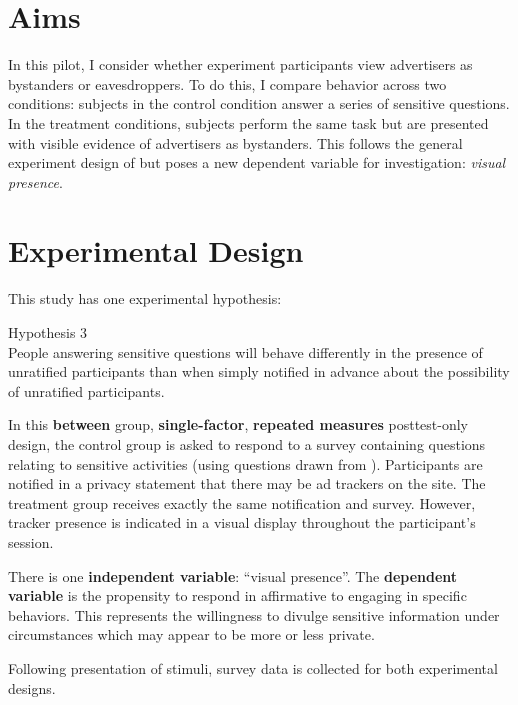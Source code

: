 \section{Aims}
\label{aims}

In this pilot, I consider whether experiment participants view advertisers as bystanders or eavesdroppers. To do this, I compare behavior across two conditions: subjects in the control condition answer a series of sensitive questions. In the treatment conditions, subjects perform the same task but are presented with visible evidence of advertisers as bystanders. This follows the general experiment design of  \citep{Acquisti:2012tp}  but poses a new dependent variable for investigation: \emph{visual presence}.

\section{Experimental Design}
\label{experimentaldesign}

This study has one experimental hypothesis:

\begin{description}
\item{Hypothesis 3} \hfill \\
People answering sensitive questions will behave differently in the presence of unratified participants than when simply notified in advance about the possibility of unratified participants.
\end{description}

In this \textbf{between} group, \textbf{single-factor}, \textbf{repeated measures} posttest-only design, the control group is asked to respond to a survey containing questions relating to sensitive activities (using questions drawn from  \cite{Acquisti:2012tp}).  Participants are notified in a privacy statement that there may be ad trackers on the site. The treatment group receives exactly the same notification and survey. However, tracker presence is indicated in a visual display throughout the participant's session. 

There is one \textbf{independent variable}: ``visual presence''. The \textbf{dependent variable} is the propensity to respond in affirmative to engaging in specific behaviors. This represents the willingness to divulge sensitive information under circumstances which may appear to be more or less private. 

Following presentation of stimuli, survey data is collected for both experimental designs. 

